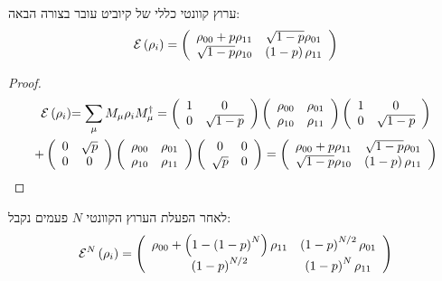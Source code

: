 \documentclass{tstextbook}
\begin{document}
\begin{proposition}
ערוץ קוונטי כללי של קיוביט עובר בצורה הבאה:
$$\mathcal{E} \left( \rho_{i} \right)=\left(\begin{array}{c c}{{\rho_{00}+p\rho_{11}}}&{{\sqrt{1-p}\rho_{01}}}\\ {{\sqrt{1-p}\rho_{10}}}&{{\left(1-p\right)\rho_{11}}}\end{array}\right) $$

\end{proposition}
\begin{proof}
\begin{gather*}{\mathcal{E} \left(\rho_{i}\right)}{=\sum_{\mu}M_{\mu}\rho_{i}M_{\mu}^{\dagger}=\left(\begin{array}{c c}{{1}}&{{0}}\\ {{0}}&{{\sqrt{1-p}}}\end{array}\right)\left(\begin{array}{c c}{{\rho_{00}}}&{{\rho_{01}}}\\ {{\rho_{10}}}&{{\rho_{11}}}\end{array}\right)\left(\begin{array}{c c}{{1}}&{{0}}\\ {{0}}&{{\sqrt{1-p}}}\end{array}\right)}\\ \begin{array}{c c}{{+\left(\begin{array}{c c}{{0}}&{{\sqrt{p}}}\\ {{0}}&{{0}}\end{array}\right)\left(\begin{array}{c c}{{\rho_{00}}}&{{\rho_{01}}}\\ {{\rho_{10}}}&{{\rho_{11}}}\end{array}\right)\left(\begin{array}{c c}{{0}}&{{0}}\\ {{\sqrt{p}}}&{{0}}\end{array}\right)=\left(\begin{array}{c c}{{\rho_{00}+p\rho_{11}}}&{{\sqrt{1-p}\rho_{01}}}\\ {{\sqrt{1-p}\rho_{10}}}&{{\left(1-p\right)\rho_{11}}}\end{array}\right)}}\end{array} 
\end{gather*}

\end{proof}
\begin{proposition}
לאחר הפעלת הערוץ הקוונטי \(N\) פעמים נקבל:
$$\mathcal{E} ^{N}\left(\rho_{i}\right)=\left(\begin{array}{c c}{{\rho_{00}+\left(1-\left(1-p\right)^{N}\right)\rho_{11}}}&{{\left(1-p\right)^{N/2}\rho_{01}}}\\ {{\left(1-p\right)^{N/2}}}&{{\left(1-p\right)^{N}\rho_{11}}}\end{array}\right)$$

\end{proposition}
\end{document}

